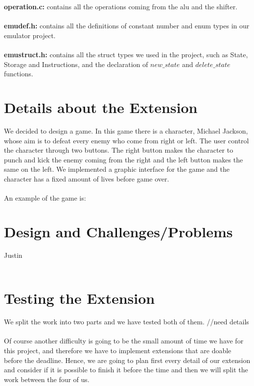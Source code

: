 \documentclass[a4paper]{article}
\begin{document}
\\\\
\textbf{operation.c:} contains all the operations coming from the alu and the shifter.
\\\\
\textbf{emudef.h:} contains all the definitions of constant number and enum types in our emulator project.
\\\\
\textbf{emustruct.h:} contains all the struct types we used in the project, such as State, Storage and Instructions, and the declaration of $new\_state$ and $delete\_state$ functions.

\section{Details about the Extension}
We decided to design a game. In this game there is a character, Michael Jackson, whose aim is to defeat every enemy who come from right or left. The user control the character through two buttons. The right button makes the character to punch and kick the enemy coming from the right and the left button makes the same on the left. We implemented a graphic interface for the game and the character has a fixed amount of lives before game over. 
\\\\
An example of the game is: 


\section{Design and Challenges/Problems}
Justin
\\\\

\section{Testing the Extension}
We split the work into two parts and we have tested both of them. //need details
\\\\
Of course another difficulty is going to be the small amount of time we have for this project, and therefore we have to implement extensions that are doable before the deadline. Hence, we are going to plan first every detail of our extension and consider if it is possible to finish it before the time and then we will split the work between the four of us.
\end{document}
